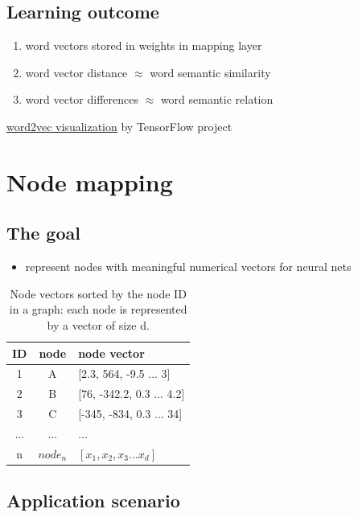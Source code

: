 \documentclass{article}
\begin{document}
\subsection{Learning outcome}
\begin{enumerate}
	\item word vectors stored in weights in mapping layer
	\item word vector distance $ \approx $ word semantic similarity
	\item word vector differences $ \approx $ word semantic relation
\end{enumerate}
\href{https://www.tensorflow.org/versions/r0.7/tutorials/word2vec/index.html}{word2vec
 visualization} by TensorFlow project

\section{Node mapping}

\subsection{The goal}
\begin{itemize}
	\item represent nodes with meaningful numerical vectors for neural nets
\end{itemize}
\begin{table}[H]
	\centering
	\begin{tabularx}{0.5\textwidth}{|c|c|X|} \hline
		ID & node & node vector \\ \hline
		1 & A & [2.3, 564, -9.5 ... 3] \\ \hline
		2 & B & [76, -342.2, 0.3 ... 4.2] \\ \hline
		3 & C & [-345, -834, 0.3 ... 34] \\ \hline
		... & ... & ... \\ \hline
		n & $ node_n $ & $ [x_1, x_2, x_3 ... x_d] $ \\ \hline
	\end{tabularx}
	\caption{Node vectors sorted by the node ID in a graph: each node is 
	represented by a vector of size d.}
	\label{tab:node}
\end{table}

\subsection{Application scenario}
\end{document}
